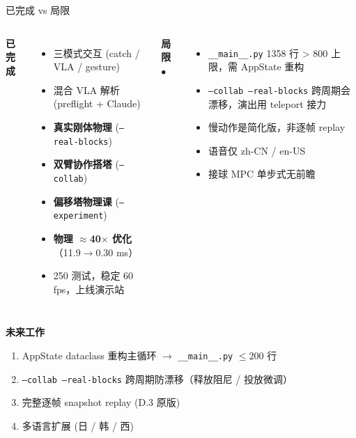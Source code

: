 \documentclass[aspectratio=169, 11pt]{beamer}
\begin{document}
\begin{frame}{已完成 vs 局限}
\begin{columns}[T]
\textbf{已完成 \checkmark}
\footnotesize
\begin{itemize}
\item 三模式交互 (catch / VLA / gesture)
\item 混合 VLA 解析 (preflight + Claude)
\item \textbf{真实刚体物理} (\texttt{--real-blocks})
\item \textbf{双臂协作搭塔} (\texttt{--collab})
\item \textbf{偏移塔物理课} (\texttt{--experiment})
\item \textbf{物理 $\approx$40$\times$ 优化}（11.9$\to$0.30 ms）
\item 250 测试，稳定 60 fps，上线演示站
\end{itemize}

\textbf{局限 $\bullet$}
\footnotesize
\begin{itemize}
\item \texttt{\_\_main\_\_.py} 1358 行 > 800 上限，需 AppState 重构
\item \texttt{--collab --real-blocks} 跨周期会漂移，演出用 teleport 接力
\item 慢动作是简化版，非逐帧 replay
\item 语音仅 zh-CN / en-US
\item 接球 MPC 单步式无前瞻
\end{itemize}
\end{columns}

\vspace{12pt}
\textbf{未来工作}
\footnotesize
\begin{enumerate}
\item AppState dataclass 重构主循环 $\to$ \texttt{\_\_main\_\_.py} $\leq 200$ 行
\item \texttt{--collab --real-blocks} 跨周期防漂移（释放阻尼 / 投放微调）
\item 完整逐帧 snapshot replay (D.3 原版)
\item 多语言扩展 (日 / 韩 / 西)
\end{enumerate}
\end{frame}
\end{document}
